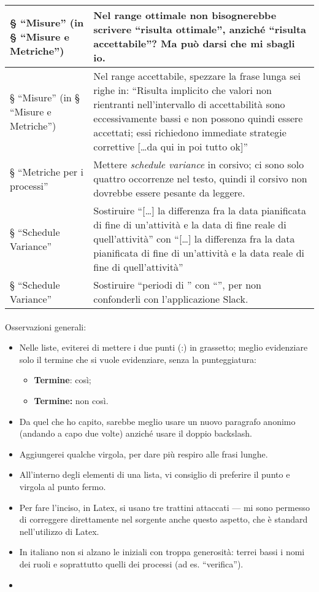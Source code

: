 \documentclass[a4paper]{article}
\begin{document}
\begin{center}
\begin{tabular}{| p{4cm} | p{7cm} |}
	§ “Misure” (in § “Misure e Metriche”) & Nel range ottimale non bisognerebbe scrivere “risulta ottimale”, anziché “risulta accettabile”? Ma può darsi che mi sbagli io. \\ \hline
	§ “Misure” (in § “Misure e Metriche”) & Nel range accettabile, spezzare la frase lunga sei righe in: “Risulta implicito che valori non rientranti nell'intervallo di accettabilità sono eccessivamente bassi e non possono quindi essere accettati; essi richiedono immediate strategie correttive [\dots da qui in poi tutto ok]” \\ \hline
	§ “Metriche per i processi” & Mettere \emph{schedule variance} in corsivo; ci sono solo quattro occorrenze nel testo, quindi il corsivo non dovrebbe essere pesante da leggere. \\ \hline
	§ “Schedule Variance” & Sostiruire “[\dots] la differenza fra la data pianificata di fine di un’attività e la data di fine reale di quell'attività” con “[\dots] la differenza fra la data pianificata di fine di un’attività e la data reale di fine di quell'attività” \\ \hline
	§ “Schedule Variance” & Sostiruire “periodi di \gloss{slack}” con “\gloss{periodi di slack}”, per non confonderli con l'applicazione Slack. \\ \hline
\end{tabular}
\end{center}

\paragraph{}
Osservazioni generali:
\begin{itemize}
	\item Nelle liste, eviterei di mettere i due punti (:) in grassetto; meglio evidenziare solo il termine che si vuole evidenziare, senza la punteggiatura:
	\begin{itemize}
		\item \textbf{Termine}: così;
		\item \textbf{Termine:} non così.
	\end{itemize}
	\item Da quel che ho capito, sarebbe meglio usare un nuovo paragrafo anonimo (andando a capo due volte) anziché usare il doppio backslash.
	\item Aggiungerei qualche virgola, per dare più respiro alle frasi lunghe.
	\item All'interno degli elementi di una lista, vi consiglio di preferire il punto e virgola al punto fermo.
	\item Per fare l'inciso, in Latex, si usano tre trattini attaccati --- mi sono permesso di correggere direttamente nel sorgente anche questo aspetto, che è standard nell'utilizzo di Latex.
	\item In italiano non si alzano le iniziali con troppa generosità: terrei bassi i nomi dei ruoli e soprattutto quelli dei processi (ad es. “verifica”).
	\item 
\end{itemize}
\end{document}
